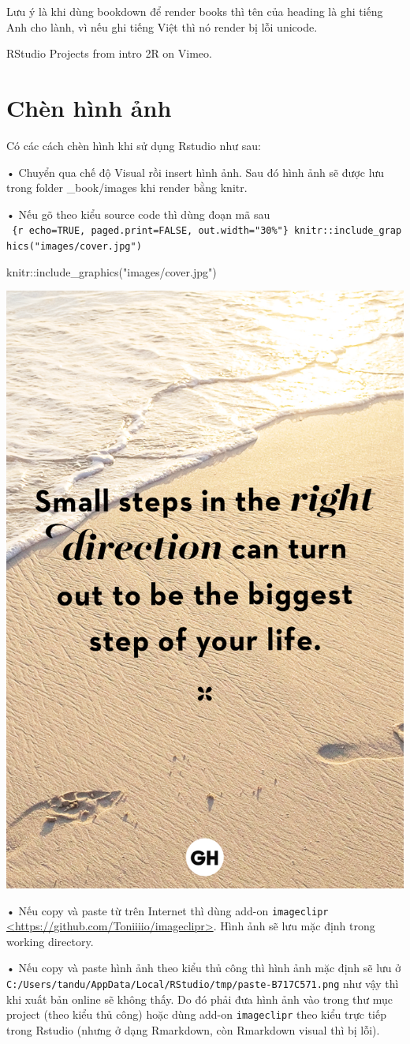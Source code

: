 \documentclass[
]{book}
\newenvironment{Shaded}{\begin{snugshade}}{\end{snugshade}}
\newcommand{\FunctionTok}[1]{\textcolor[rgb]{0.00,0.00,0.00}{#1}}
\newcommand{\NormalTok}[1]{#1}
\newcommand{\SpecialCharTok}[1]{\textcolor[rgb]{0.00,0.00,0.00}{#1}}
\newcommand{\StringTok}[1]{\textcolor[rgb]{0.31,0.60,0.02}{#1}}
\theoremstyle{definition}
\theoremstyle{definition}
\theoremstyle{definition}
\theoremstyle{definition}
\theoremstyle{remark}
\begin{document}
Lưu ý là khi dùng bookdown để render books thì tên của heading là ghi tiếng Anh cho lành, vì nếu ghi tiếng Việt thì nó render bị lỗi unicode.

RStudio Projects from intro 2R on Vimeo.

\hypertarget{chuxe8n-huxecnh-ux1ea3nh}{%
\section{Chèn hình ảnh}\label{chuxe8n-huxecnh-ux1ea3nh}}

Có các cách chèn hình khi sử dụng Rstudio như sau:

• Chuyển qua chế độ Visual rồi insert hình ảnh. Sau đó hình ảnh sẽ được lưu trong folder \_book/images khi render bằng knitr.

• Nếu gõ theo kiểu source code thì dùng đoạn mã sau
\texttt{\textasciigrave{}\textasciigrave{}\textasciigrave{}\ \{r\ echo=TRUE,\ paged.print=FALSE,\ out.width="30\%"\}\ knitr::include\_graphics("images/cover.jpg")\ \textasciigrave{}\textasciigrave{}\textasciigrave{}}

\begin{Shaded}
\begin{Highlighting}[]
\NormalTok{knitr}\SpecialCharTok{::}\FunctionTok{include\_graphics}\NormalTok{(}\StringTok{"images/cover.jpg"}\NormalTok{)}
\end{Highlighting}
\end{Shaded}

\includegraphics[width=0.3\linewidth]{images/cover}

• Nếu copy và paste từ trên Internet thì dùng add-on \texttt{imageclipr} \href{https://github.com/Toniiiio/imageclipr}{\textless https://github.com/Toniiiio/imageclipr\textgreater{}}. Hình ảnh sẽ lưu mặc định trong working directory.

• Nếu copy và paste hình ảnh theo kiểu thủ công thì hình ảnh mặc định sẽ lưu ở \texttt{C:/Users/tandu/AppData/Local/RStudio/tmp/paste-B717C571.png} như vậy thì khi xuất bản online sẽ không thấy. Do đó phải đưa hình ảnh vào trong thư mục project (theo kiểu thủ công) hoặc dùng add-on \texttt{imageclipr} theo kiểu trực tiếp trong Rstudio (nhưng ở dạng Rmarkdown, còn Rmarkdown visual thì bị lỗi).
\end{document}
